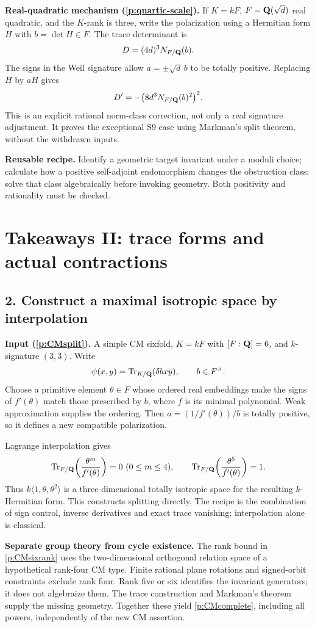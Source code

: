 \textbf{Real-quadratic mechanism (\ref{p:quartic-scale}).} If $K=kF$, $F=\mathbf Q(\sqrt d)$ real quadratic, and the $K$-rank is three, write the polarization using a Hermitian form $H$ with $b=\det H\in F$. The trace determinant is
\[
 D=(4d)^3N_{F/\mathbf Q}(b).
\]
The signs in the Weil signature allow $a=\pm\sqrt d\,b$ to be totally positive. Replacing $H$ by $aH$ gives
\[
 D'=-\bigl(8d^3N_{F/\mathbf Q}(b)^2\bigr)^2.
\]
This is an explicit rational norm-class correction, not only a real signature adjustment. It proves the exceptional S9 case using Markman's split theorem, without the withdrawn inputs.

\textbf{Reusable recipe.} Identify a geometric target invariant under a moduli choice; calculate how a positive self-adjoint endomorphism changes the obstruction class; solve that class algebraically before invoking geometry. Both positivity and rationality must be checked.
\newpage
\section*{Takeaways II: trace forms and actual contractions}
\subsection*{2. Construct a maximal isotropic space by interpolation}
\textbf{Input (\ref{p:CMsplit}).} A simple CM sixfold, $K=kF$ with $[F:\mathbf Q]=6$, and $k$-signature $(3,3)$. Write
\[
 \psi(x,y)=\operatorname{Tr}_{K/\mathbf Q}(\delta b x\bar y),\qquad b\in F^\times.
\]
Choose a primitive element $\theta\in F$ whose ordered real embeddings make the signs of $f'(\theta)$ match those prescribed by $b$, where $f$ is its minimal polynomial. Weak approximation supplies the ordering. Then $a=(1/f'(\theta))/b$ is totally positive, so it defines a new compatible polarization.

Lagrange interpolation gives
\[
 \Tr_{F/\Q}\!\left(\frac{\theta^m}{f'(\theta)}\right)=0\ (0\le m\le4),
 \qquad
 \Tr_{F/\Q}\!\left(\frac{\theta^5}{f'(\theta)}\right)=1.
\]
Thus $k\langle1,\theta,\theta^2\rangle$ is a three-dimensional totally isotropic space for the resulting $k$-Hermitian form. This constructs splitting directly. The recipe is the combination of sign control, inverse derivatives and exact trace vanishing; interpolation alone is classical.

\textbf{Separate group theory from cycle existence.} The rank bound in \ref{p:CMsixrank} uses the two-dimensional orthogonal relation space of a hypothetical rank-four CM type. Finite rational plane rotations and signed-orbit constraints exclude rank four. Rank five or six identifies the invariant generators; it does not algebraize them. The trace construction and Markman's theorem supply the missing geometry. Together these yield \ref{p:CMcomplete}, including all powers, independently of the new CM assertion.

